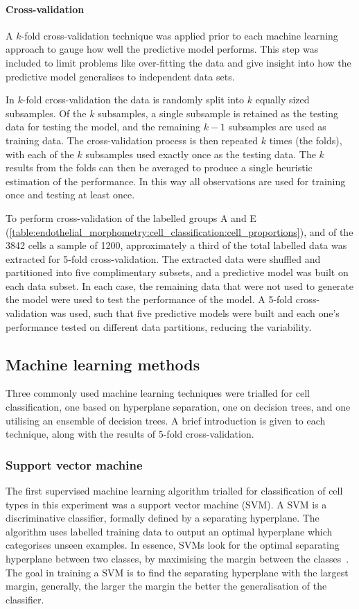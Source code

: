 \paragraph{Cross-validation}
A $k$-fold cross-validation technique was applied prior to each machine learning approach to gauge how well the predictive model performs. This step was included to limit problems like over-fitting the data and give insight into how the predictive model generalises to independent data sets.

In $k$-fold cross-validation the data is randomly split into $k$ equally sized subsamples. Of the $k$ subsamples, a single subsample is retained as the testing data for testing the model, and the remaining $k - 1$ subsamples are used as training data. The cross-validation process is then repeated $k$ times (the folds), with each of the $k$ subsamples used exactly once as the testing data. The $k$ results from the folds can then be averaged to produce a single heuristic estimation of the performance. In this way all observations are used for training once and testing at least once.

To perform cross-validation of the labelled groups A and E (\autoref{table:endothelial_morphometry:cell_classification:cell_proportions}), and of the 3842 cells a sample of 1200, approximately a third of the total labelled data was extracted for 5-fold cross-validation. The extracted data were shuffled and partitioned into five complimentary subsets, and a predictive model was built on each data subset. In each case, the remaining data that were not used to generate the model were used to test the performance of the model. A 5-fold cross-validation was used, such that five predictive models were built and each one's performance tested on different data partitions, reducing the variability.

\subsection{Machine learning methods}
Three commonly used machine learning techniques were trialled for cell classification, one based on hyperplane separation, one on decision trees, and one utilising an ensemble of decision trees. A brief introduction is given to each technique, along with the results of 5-fold cross-validation.

\subsubsection{Support vector machine}
The first supervised machine learning algorithm trialled for classification of cell types in this experiment was a support vector machine (SVM). A SVM is a discriminative classifier, formally defined by a separating hyperplane. The algorithm uses labelled training data to output an optimal hyperplane which categorises unseen examples. In essence, SVMs look for the optimal separating hyperplane between two classes, by maximising the margin between the classes~\cite{Cortes1995}. The goal in training a SVM is to find the separating hyperplane with the largest margin, generally, the larger the margin the better the generalisation of the classifier.

